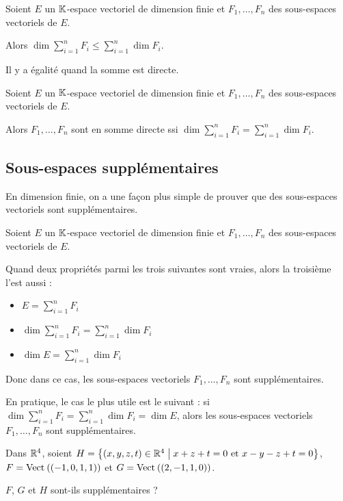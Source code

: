 \begin{prop}
Soient \(E\) un \(\mathbb{K}\)-espace vectoriel de dimension finie et \(F_1,\dots,F_n\) des sous-espaces vectoriels de \(E\).

Alors \(\dim\sum_{i=1}^nF_i\leq\sum_{i=1}^n\dim F_i\).
\end{prop}

Il y a égalité quand la somme est directe.

\begin{theo}
Soient \(E\) un \(\mathbb{K}\)-espace vectoriel de dimension finie et \(F_1,\dots,F_n\) des sous-espaces vectoriels de \(E\).

Alors \(F_1,\dots,F_n\) sont en somme directe ssi \(\dim\sum_{i=1}^nF_i=\sum_{i=1}^n\dim F_i\).
\end{theo}

\subsection{Sous-espaces supplémentaires}

En dimension finie, on a une façon plus simple de prouver que des sous-espaces vectoriels sont supplémentaires.

\begin{prop}
Soient \(E\) un \(\mathbb{K}\)-espace vectoriel de dimension finie et \(F_1,\dots,F_n\) des sous-espaces vectoriels de \(E\).

Quand deux propriétés parmi les trois suivantes sont vraies, alors la troisième l'est aussi :

\begin{itemize}
    \item \(E=\sum_{i=1}^nF_i\) \\
    \item \(\dim\sum_{i=1}^nF_i=\sum_{i=1}^n\dim F_i\) \\
    \item \(\dim E=\sum_{i=1}^n\dim F_i\)
\end{itemize}

Donc dans ce cas, les sous-espaces vectoriels \(F_1,\dots,F_n\) sont supplémentaires.
\end{prop}

En pratique, le cas le plus utile est le suivant : si \(\dim\sum_{i=1}^nF_i=\sum_{i=1}^n\dim F_i=\dim E\), alors les sous-espaces vectoriels \(F_1,\dots,F_n\) sont supplémentaires.

\begin{exo}
Dans \(\mathbb{R}^4\), soient \(H=\left\lbrace\left(x,y,z,t\right)\in\mathbb{R}^4\;\middle|\; x+z+t=0\text{ et }x-y-z+t=0\right\rbrace\), \(F=\Vect{\paren{-1,0,1,1}}\) et \(G=\Vect{\paren{2,-1,1,0}}\).

\(F\), \(G\) et \(H\) sont-ils supplémentaires ?
\end{exo}

